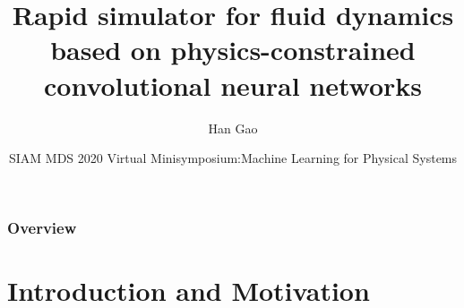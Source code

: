 \documentclass{beamer}
\title[Apply CNN to solve fluid problem]{Rapid simulator for fluid dynamics based on physics-constrained convolutional neural networks} %
\author{Han Gao} %
\institute[Notre Dame] %
{
Aerospace and Mechanical Engineering
\newline
Center of Informatics and Computational Science
\newline
University of Notre Dame
\\%
\medskip
\textit{hgao1@nd.edu} %
}
\date{SIAM MDS 2020 Virtual Minisymposium:\newline Machine Learning for Physical Systems
	\newline} %
\begin{document}
\begin{frame}
\titlepage %
\end{frame}

\begin{frame}
\frametitle{Overview} %
\tableofcontents %
\end{frame}


\section{Introduction and Motivation} %
\end{document}
